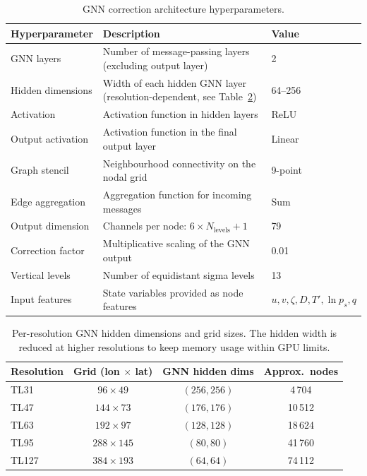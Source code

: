 \begin{table}[htbp]
\centering
\small
\begin{tabular}{lp{6.4cm}l}
\hline
\textbf{Hyperparameter} & \textbf{Description} & \textbf{Value} \\
\hline\hline
GNN layers & Number of message-passing layers (excluding output layer) & 2 \\
Hidden dimensions & Width of each hidden GNN layer (resolution-dependent, see Table~\ref{tab:hidden_dims}) & 64--256 \\
Activation & Activation function in hidden layers & ReLU \\
Output activation & Activation function in the final output layer & Linear \\
Graph stencil & Neighbourhood connectivity on the nodal grid & 9-point \\
Edge aggregation & Aggregation function for incoming messages & Sum \\
Output dimension & Channels per node: $6 \times N_\text{levels} + 1$ & 79 \\
Correction factor & Multiplicative scaling of the GNN output & 0.01 \\
Vertical levels & Number of equidistant sigma levels & 13 \\
Input features & State variables provided as node features & $u, v, \zeta, D, T', \ln p_s, q$ \\
\hline
\end{tabular}
\caption{GNN correction architecture hyperparameters.}
\label{tab:hyperparams_arch}
\end{table}

\begin{table}[htbp]
\centering
\small
\begin{tabular}{lccc}
\hline
\textbf{Resolution} & \textbf{Grid (lon $\times$ lat)} & \textbf{GNN hidden dims} & \textbf{Approx.\ nodes} \\
\hline\hline
TL31  & $96 \times 49$   & $(256, 256)$ & 4\,704 \\
TL47  & $144 \times 73$  & $(176, 176)$ & 10\,512 \\
TL63  & $192 \times 97$  & $(128, 128)$ & 18\,624 \\
TL95  & $288 \times 145$ & $(80, 80)$   & 41\,760 \\
TL127 & $384 \times 193$ & $(64, 64)$   & 74\,112 \\
\hline
\end{tabular}
\caption{Per-resolution GNN hidden dimensions and grid sizes.  The hidden width is reduced at higher resolutions to keep memory usage within GPU limits.}
\label{tab:hidden_dims}
\end{table}

